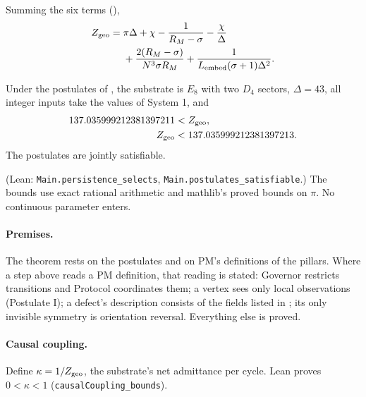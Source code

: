 Summing the six terms (),
\begin{equation}\label{eq:alpha_inverse}
\begin{split}
Z_{\rm geo}={}&\pi\Delta+\chi-\frac1{R_M-\sigma}-\frac\chi\Delta\\
&+\frac{2(R_M-\sigma)}{N^3\sigma R_M}+\frac1{L_{\rm embed}(\sigma+1)\Delta^2}.
\end{split}
\end{equation}

\begin{theorem}
Under the postulates of , the substrate is $E_8$ with two $D_4$ sectors, $\Delta=43$, all integer inputs take the values of System 1, and
\begin{align*}
137.035999212381397211&<Z_{\rm geo},\\
Z_{\rm geo}&<137.035999212381397213.
\end{align*}
The postulates are jointly satisfiable.
\end{theorem}
(Lean: \texttt{Main.persistence\_selects}, \texttt{Main.postulates\_satisfiable}.) The bounds use exact rational arithmetic and mathlib's proved bounds on $\pi$. No continuous parameter enters.

\paragraph{Premises.} The theorem rests on the postulates and on PM's definitions of the pillars. Where a step above reads a PM definition, that reading is stated: Governor restricts transitions and Protocol coordinates them; a vertex sees only local observations (Postulate I); a defect's description consists of the fields listed in ; its only invisible symmetry is orientation reversal. Everything else is proved.

\paragraph{Causal coupling.} Define $\kappa=1/Z_{\rm geo}$, the substrate's net admittance per cycle. Lean proves $0<\kappa<1$ (\texttt{causalCoupling\_bounds}).
